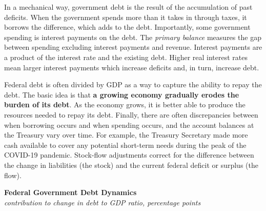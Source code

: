 \documentclass{report}
\makeatletter
\newcommand*\short[1]{\expandafter\@gobbletwo\number\numexpr#1\relax}
\newcommand{\ctsbar}[5]{
		\addplot[ybar stacked, bar width=#5, draw opacity=0, fill=#1] 
			table [x=#2, y=#3, col sep=comma]{#4};}
\newcommand{\dateaxisticks}{
		date coordinates in=x, axis line style={draw=none},
		xmax={2022-03-15},
		max space between ticks=40,	    
		xtick={{1990-01-01}, {1992-01-01}, {1994-01-01}, 
			{1996-01-01}, {1998-01-01}, {2000-01-01}, 
			{2002-01-01}, {2004-01-01}, {2006-01-01},
			{2008-01-01}, {2010-01-01}, {2012-01-01}, {2014-01-01},
		    {2016-01-01}, {2018-01-01}, {2020-01-01}, {2022-01-01}, 
		    {2024-01-01}, {2026-01-01}},
		minor xtick={{1989-01-01}, {1991-01-01}, {1993-01-01},
			{1995-01-01}, {1997-01-01}, {1999-01-01}, 
			{2001-01-01}, {2003-01-01}, {2005-01-01}, {2007-01-01},
		    {2009-01-01}, {2011-01-01}, {2013-01-01}, {2015-01-01},
		    {2017-01-01}, {2019-01-01}, {2021-01-01}, {2023-01-01}, 
		    {2025-01-01}, {2027-01-01}},
		enlarge y limits={0.06}, enlarge x limits={0.01},
		}
\newcommand{\bbar}[2]{extra #1 ticks = {{#2}}, extra #1 tick labels = ,
		extra #1 tick style = {grid=major, grid style={thick, black!25}},}
\newcommand{\rbars}{
		\fill[color=black!10] (axis cs:{1990-07-01},\pgfkeysvalueof{/pgfplots/ymin}) rectangle 
			(axis cs:{1991-03-01}, \pgfkeysvalueof{/pgfplots/ymax});
		\fill[color=black!10] (axis cs:{2007-12-01},\pgfkeysvalueof{/pgfplots/ymin}) rectangle 
			(axis cs:{2009-07-01}, \pgfkeysvalueof{/pgfplots/ymax});
		\fill[color=black!10] (axis cs:{2001-03-01},\pgfkeysvalueof{/pgfplots/ymin}) rectangle 
			(axis cs:{2001-11-01}, \pgfkeysvalueof{/pgfplots/ymax});
		\fill[color=black!10] (axis cs:{2020-02-01},\pgfkeysvalueof{/pgfplots/ymin}) rectangle 
			(axis cs:{2020-05-01}, \pgfkeysvalueof{/pgfplots/ymax});}
\makeatother
\begin{document}
{\begin{minipage}{0.76\textwidth}
In a mechanical way, government debt is the result of the accumulation of past deficits. When the government spends more than it takes in through taxes, it borrows the difference, which adds to the debt. Importantly, some government spending is interest payments on the debt. The \textit{primary balance} measures the gap between spending excluding interest payments and revenue. Interest payments are a product of the interest rate and the existing debt. Higher real interest rates mean larger interest payments which increase deficits and, in turn, increase debt.

Federal debt is often divided by GDP as a way to capture the ability to repay the debt. The basic idea is that \textbf{a growing economy gradually erodes the burden of its debt}. As the economy grows, it is better able to produce the resources needed to repay its debt. Finally, there are often discrepancies between when borrowing occurs and when spending occurs, and the account balances at the Treasury vary over time. For example, the Treasury Secretary made more cash available to cover any potential short-term needs during the peak of the COVID-19 pandemic. Stock-flow adjustments correct for the difference between the change in liabilities (the stock) and the current federal deficit or surplus (the flow).


\vspace{2mm}

\normalsize \textbf{Federal Government Debt Dynamics}\\
\footnotesize{\textit{contribution to change in debt to GDP ratio, percentage points}}
\vspace{5.6cm}

\hspace*{4mm} 


\end{minipage}}
\end{document}
